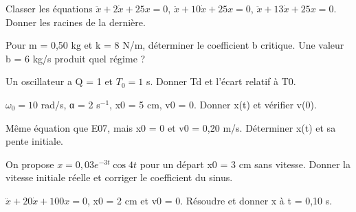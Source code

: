 \begin{questions}
\item Classer les équations $\ddot x+2\dot x+25x=0$, $\ddot x+10\dot x+25x=0$, $\ddot x+13\dot x+25x=0$. Donner les racines de la dernière.
\end{questions}

\begin{questions}
\item Pour m = 0,50 kg et k = 8 N/m, déterminer le coefficient b critique. Une valeur b = 6 kg/s produit quel régime ?
\end{questions}

\begin{questions}
\item Un oscillateur a Q = 1 et $T_0=1$ s. Donner Td et l’écart relatif à T0.
\end{questions}



\begin{questions}
\item $\omega_0=10$ rad/s, α = 2 s$^{-1}$, x0 = 5 cm, v0 = 0. Donner x(t) et vérifier v(0).
\end{questions}

\begin{questions}
\item Même équation que E07, mais x0 = 0 et v0 = 0,20 m/s. Déterminer x(t) et sa pente initiale.
\end{questions}

\begin{questions}
\item On propose $x=0{,}03e^{-3t}\cos4t$ pour un départ x0 = 3 cm sans vitesse. Donner la vitesse initiale réelle et corriger le coefficient du sinus.
\end{questions}



\begin{questions}
\item $\ddot x+20\dot x+100x=0$, x0 = 2 cm et v0 = 0. Résoudre et donner x à t = 0,10 s.
\end{questions}

